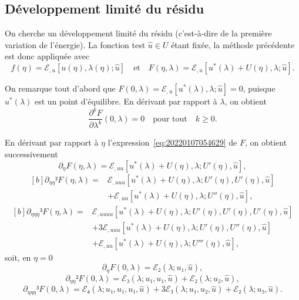 \documentclass[12pt, final]{scrartcl}
\theoremstyle{definition}
\begin{document}
\subsection{Développement limité du résidu}
\label{sec:20211112182000}
%

On cherche un développement limité du résidu (c'est-à-dire de la première
variation de l'énergie). La fonction test \(\hat{u} ∈ U\) étant fixée, la
méthode précédente est donc appliquée avec
\begin{equation}
  \label{eq:20220107054629}
  f(η) = ℰ_{, u} [u(η), λ(η); \hat{u}]
  \quad \text{et} \quad
  F(η, λ) = ℰ_{, u}[u^{\ast}(λ) + U(η), λ; \hat{u}].
\end{equation}

On remarque tout d'abord que
\(F(0, λ) =ℰ_{, u} [u^{\ast} (λ), λ; \hat{u}] = 0\), puisque \(u^{\ast}(λ)\) est
un point d'équilibre. En dérivant par rapport à \(λ\), on obtient
\begin{equation*}
  \frac{∂^k F}{∂ λ^k}(0, λ) = 0 \quad \text{pour tout} \quad k ≥ 0.
\end{equation*}

En dérivant par rapport à \(η\) l'expression~\eqref{eq:20220107054629} de \(F\),
on obtient successivement
\begin{equation*}
  ∂_{η}F(η, λ) = ℰ_{, u u}[u^{\ast}(λ) + U(η), λ; U'(η), \hat{u}],
\end{equation*}
\begin{equation*}
  \begin{aligned}[b]
    ∂_{η η}² F(η, λ) ={}
    & ℰ_{, uuu}[u^{\ast}(λ) + U(η), λ; U'(η), U'(η), \hat{u}]\\
    & + ℰ_{, uu} [u^{\ast}(λ) + U(η), λ; U''(η), \hat{u}],
  \end{aligned}
\end{equation*}
\begin{equation*}
  \begin{aligned}[b]
    ∂_{ηηη}³ F(η, λ) ={}
    & ℰ_{, uuuu}[u^{\ast}(λ) + U(η), λ; U'(η), U'(η), U'(η), \hat{u}]\\
    & + 3ℰ_{, u u u}[u^{\ast}(λ) + U(η), λ; U'(η), U''(η), \hat{u}]\\
    & + ℰ_{, uu}[u^{\ast}(λ) + U(η), λ; U'''(η), \hat{u}],
  \end{aligned}
\end{equation*}
soit, en \(η = 0\)
\[∂_{η}F(0, λ) = ℰ₂(λ; u₁, \hat{u}),\]
\[∂_{ηη}² F(0, λ) = ℰ₃(λ; u₁, u₁, \hat{u}) + ℰ₂(λ; u₂, \hat{u}),\]
\[∂_{ηηη}³ F(0, λ) = ℰ₄(λ; u₁, u₁, u₁, \hat{u}) + 3ℰ₃(λ; u₁, u₂, \hat{u}) + ℰ₂(λ; u₃, \hat{u}).\]
\end{document}
